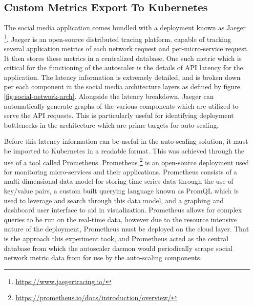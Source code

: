 \subsection{Custom Metrics Export To Kubernetes}
\label{subsec:metrics-export}

The social media application comes bundled with a deployment known as Jaeger \footnote{\url{https://www.jaegertracing.io/}}. Jaeger is an open-source distributed tracing platform, capable of tracking several application metrics of each network request and per-micro-service request. It then stores these metrics in a centralized database. One such metric which is critical for the functioning of the autoscaler is the details of API latency for the application. The latency information is extremely detailed, and is broken down per each component in the social media architecture layers as defined by figure \ref{fig:social-network-arch}. Alongside the latency breakdown, Jaeger can automatically generate graphs of the various components which are utilized to serve the API requests. This is particularly useful for identifying deployment bottlenecks in the architecture which are prime targets for auto-scaling.\par

Before this latency information can be useful in the auto-scaling solution, it must be imported to Kubernetes in a readable format. This was achieved through the use of a tool called Prometheus. Prometheus \footnote{\url{https://prometheus.io/docs/introduction/overview/}} is an open-source deployment used for monitoring micro-services and their applications. Prometheus consists of a multi-dimensional data model for storing time-series data through the use of key/value pairs, a custom built querying language known as PromQL which is used to leverage and search through this data model, and a graphing and dashboard user interface to aid in visualization. Prometheus allows for complex queries to be run on the real-time data, however due to the resource intensive nature of the deployment, Prometheus must be deployed on the cloud layer. That is the approach this experiment took, and Prometheus acted as the central database from which the autoscaler daemon would periodically scrape social network metric data from for use by the auto-scaling components.\par

